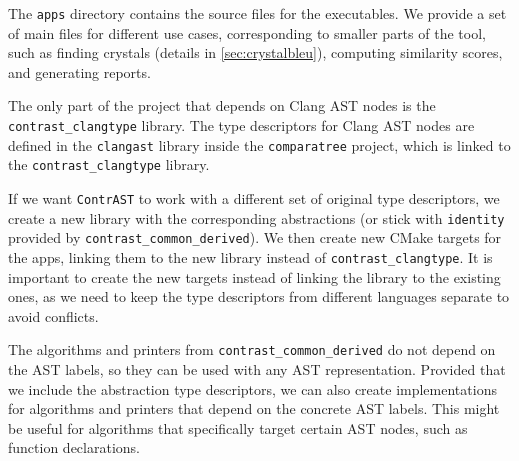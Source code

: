 The \texttt{apps} directory contains the source files for the executables.
We provide a set of main files for different use cases, corresponding to smaller parts of the tool, such as finding crystals (details in \autoref{sec:crystalbleu}), computing similarity scores, and generating reports.

The only part of the project that depends on Clang AST nodes is the \texttt{contrast\_clangtype} library.
The type descriptors for Clang AST nodes are defined in the \texttt{clangast} library inside the \texttt{comparatree} project, which is linked to the \texttt{contrast\_clangtype} library.

If we want \texttt{ContrAST} to work with a different set of original type descriptors, we create a new library with the corresponding abstractions (or stick with \texttt{identity} provided by \texttt{contrast\_common\_derived}).
We then create new CMake targets for the apps, linking them to the new library instead of \texttt{contrast\_clangtype}.
It is important to create the new targets instead of linking the library to the existing ones, as we need to keep the type descriptors from different languages separate to avoid conflicts.

The algorithms and printers from \texttt{contrast\_common\_derived} do not depend on the AST labels, so they can be used with any AST representation.
Provided that we include the abstraction type descriptors, we can also create implementations for algorithms and printers that depend on the concrete AST labels.
This might be useful for algorithms that specifically target certain AST nodes, such as function declarations.
